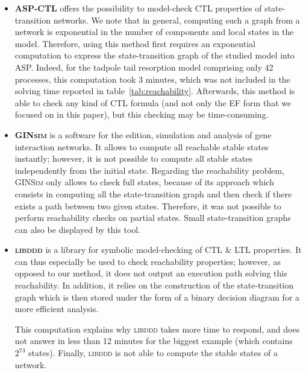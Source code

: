 \begin{itemize}

\item \textbf{ASP-CTL}  offers the possibility to model-check CTL properties
of state-transition networks.
We note that in general, computing such a graph from a network is exponential in the number of components and local states in the model.
Therefore, using this method first requires an exponential computation to
express the state-transition graph of the studied model into ASP.
Indeed, for the tadpole tail resorption model comprising only 42 processes,
this computation took 3 minutes, which was not included in the solving time
reported in table~\ref{tab:reachability}.
Afterwards, this method is able to check any kind of CTL formula
(and not only the EF form that we focused on in this paper),
but this checking may be time-consuming.

\item \textbf{\textsc{GINsim}} is a software for the edition, simulation and analysis
of gene interaction networks.
It allows to compute all reachable stable states instantly;
however, it is not possible to compute all stable states independently from the initial state.
Regarding the reachability problem, \textsc{GINSim} only allows to check
full states, because of its approach which consists in computing
all the state-transition graph and then check if there exists a path between two given states.
Therefore, it was not possible to perform reachability checks on partial states.
Small state-transition graphs can also be displayed by this tool.

\item \textbf{\textsc{libddd}}
is a library for symbolic model-checking of CTL \& LTL properties.
It can thus especially be used to check reachability properties;
however, as opposed to our method, it does not output an execution path
solving this reachability.
In addition, it relies on the construction of the state-transition graph
which is then stored under the form of a binary decision diagram for a more efficient analysis.

This computation explains why \textsc{libddd} takes more time to respond,
and does not answer in less than 12 minutes for the biggest example
(which contains $2^{73}$ states).
Finally, \textsc{libddd} is not able to compute the stable states of a network.


\end{itemize}
